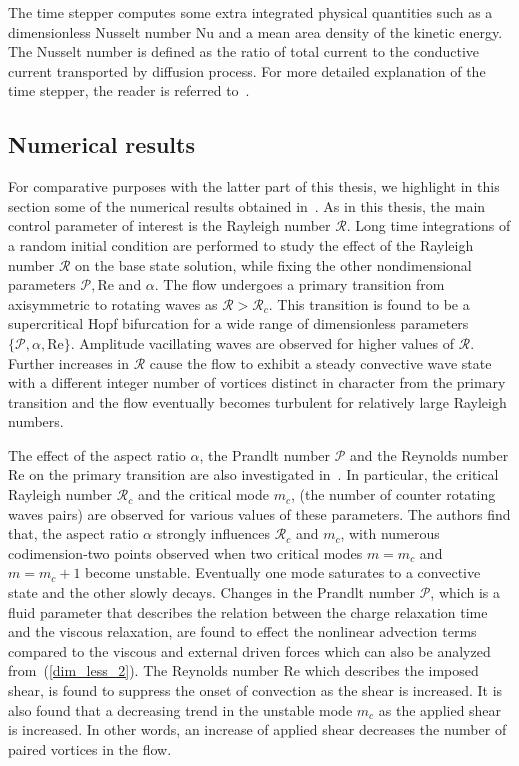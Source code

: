 The time stepper computes some extra integrated physical quantities such as a dimensionless  Nusselt number $\mathrm{Nu}$ and a mean area density of the kinetic energy. The Nusselt number is defined as  the ratio of total current to the conductive current transported by diffusion process. For more detailed explanation of the time stepper, the reader is referred to~\cite{PeiChunTsain}.

\subsection{Numerical results}
For comparative purposes with the latter part of this thesis, we highlight in this section some of the numerical results obtained in~\cite{PeiChunTsain,DNSSAE}. As in this thesis, the main control parameter of interest is the Rayleigh number $\mathcal{R}$. Long time integrations of a random initial condition are performed to study the effect of the Rayleigh number $\mathcal{R}$ on the base state solution, while fixing the other nondimensional parameters $\mathcal{P},\mathrm{Re}$ and $\alpha$. The flow undergoes a primary transition from axisymmetric to rotating waves as $\mathcal{R} > \mathcal{R}_c$. This transition is found to be a supercritical Hopf bifurcation for a wide range of dimensionless parameters $\{\mathcal{P},\alpha,\mathrm{Re}\}$. Amplitude vacillating waves are observed for higher values of $\mathcal{R}$. Further increases in $\mathcal{R}$ cause the flow to exhibit a steady convective wave state with a different integer number of vortices distinct in character from the primary transition and the flow eventually becomes turbulent for relatively large Rayleigh numbers.

The effect of the aspect ratio $\alpha$, the Prandlt number $\mathcal{P}$ and the Reynolds number $\mathrm{Re}$ on the primary transition are also investigated in~\cite{PeiChunTsain}. In particular, the critical Rayleigh number $\mathcal{R}_c$ and the critical mode $m_c$, (the number of counter rotating waves pairs) are observed for various values of these parameters. The authors find that, the aspect ratio $\alpha$ strongly influences $\mathcal{R}_c$ and $m_c$, with numerous codimension-two points observed when two critical modes $m = m_c$ and $m=m_c + 1$ become unstable. Eventually one mode saturates to a convective state and the other slowly decays.
Changes in the Prandlt number $\mathcal{P}$, which is a fluid parameter that describes the relation between the charge relaxation time and the viscous relaxation, are found to  effect the nonlinear advection terms compared to the viscous and external driven forces which can also be analyzed from~(\ref{dim_less_2}).
The Reynolds number $\mathrm{Re}$ which describes the imposed shear, is found to suppress the onset of convection as the shear is increased. It is also found that a decreasing trend in the unstable mode $m_c$ as the applied shear is increased. In other words, an increase of applied shear decreases the number of paired vortices in the flow.
